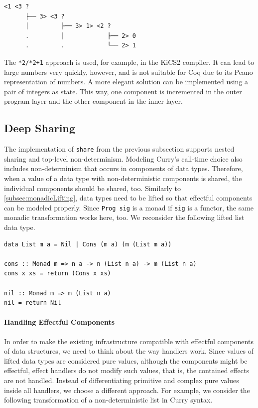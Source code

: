 \documentclass[a4paper, 11pt, fleqn, twoside]{scrreprt}
\newcommand{\hinl}[1]{\texttt{#1}}
\begin{document}
\begin{verbatim}
<1 <3 ? 
      ├── 3> <3 ? 
      │         ├── 3> 1> <2 ? 
      .         │            ├── 2> 0
      .         .            └── 2> 1

\end{verbatim}

The \hinl{*2/*2+1} approach is used, for example, in the KiCS2 compiler.
It can lead to large numbers very quickly, however, and is not suitable for Coq due to its Peano representation of numbers.
A more elegant solution can be implemented using a pair of integers as state.
This way, one component is incremented in the outer program layer and the other component in the inner layer.

\subsection{Deep Sharing}
\label{subsec:deepSharing}
The implementation of \hinl{share} from the previous subsection supports nested sharing and top-level non-determinism.
Modeling Curry's call-time choice also includes non-determinism that occurs in components of data types.
Therefore, when a value of a data type with non-deterministic components is shared, the individual components should be shared, too.
Similarly to \autoref{subsec:monadicLifting}, data types need to be lifted so that effectful components can be modeled properly.
Since \hinl{Prog sig} is a monad if \hinl{sig} is a functor, the same monadic transformation works here, too.
We reconsider the following lifted list data type.

\begin{verbatim}
data List m a = Nil | Cons (m a) (m (List m a))

cons :: Monad m => n a -> n (List n a) -> m (List n a)
cons x xs = return (Cons x xs)

nil :: Monad m => m (List n a)
nil = return Nil
\end{verbatim}

\paragraph{Handling Effectful Components}
In order to make the existing infrastructure compatible with effectful components of data structures, we need to think about the way handlers work.
Since values of lifted data types are considered pure values, although the components might be effectful, effect handlers do not modify such values, that is, the contained effects are not handled.
Instead of differentiating primitive and complex pure values inside all handlers, we choose a different approach.
For example, we consider the following transformation of a non-deterministic list in Curry syntax.
\end{document}
